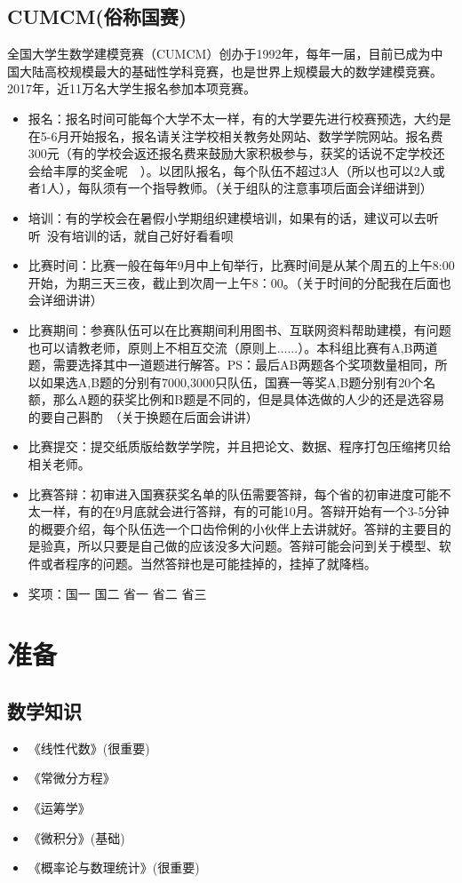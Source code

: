 \documentclass[11pt, a4paper, UTF8]{ctexart}
\begin{document}
\subsection{CUMCM(俗称国赛)}
全国大学生数学建模竞赛（CUMCM）创办于1992年，每年一届，目前已成为中国大陆高校规模最大的基础性学科竞赛，也是世界上规模最大的数学建模竞赛。2017年，近11万名大学生报名参加本项竞赛。\\
\begin{itemize}
\item 报名：报名时间可能每个大学不太一样，有的大学要先进行校赛预选，大约是在5-6月开始报名，报名请关注学校相关教务处网站、数学学院网站。报名费300元（有的学校会返还报名费来鼓励大家积极参与，获奖的话说不定学校还会给丰厚的奖金呢~~）。以团队报名，每个队伍不超过3人（所以也可以2人或者1人），每队须有一个指导教师。（关于组队的注意事项后面会详细讲到）
\item 培训：有的学校会在暑假小学期组织建模培训，如果有的话，建议可以去听听~没有培训的话，就自己好好看看呗~
\item 比赛时间：比赛一般在每年9月中上旬举行，比赛时间是从某个周五的上午8:00开始，为期三天三夜，截止到次周一上午8：00。（关于时间的分配我在后面也会详细讲讲）
\item 比赛期间：参赛队伍可以在比赛期间利用图书、互联网资料帮助建模，有问题也可以请教老师，原则上不相互交流（原则上......）。本科组比赛有A,B两道题，需要选择其中一道题进行解答。PS：最后AB两题各个奖项数量相同，所以如果选A,B题的分别有7000,3000只队伍，国赛一等奖A,B题分别有20个名额，那么A题的获奖比例和B题是不同的，但是具体选做的人少的还是选容易的要自己斟酌~（关于换题在后面会讲讲）
\item 比赛提交：提交纸质版给数学学院，并且把论文、数据、程序打包压缩拷贝给相关老师。
\item 比赛答辩：初审进入国赛获奖名单的队伍需要答辩，每个省的初审进度可能不太一样，有的在9月底就会进行答辩，有的可能10月。答辩开始有一个3-5分钟的概要介绍，每个队伍选一个口齿伶俐的小伙伴上去讲就好。答辩的主要目的是验真，所以只要是自己做的应该没多大问题。答辩可能会问到关于模型、软件或者程序的问题。当然答辩也是可能挂掉的，挂掉了就降档。
\item 奖项：国一  国二  省一  省二  省三
\end{itemize}

\section{准备}
\subsection{数学知识}
\begin{itemize}
\item 《线性代数》(很重要)
\item 《常微分方程》
\item 《运筹学》
\item 《微积分》(基础)
\item 《概率论与数理统计》(很重要)
\end{itemize}
\end{document}
